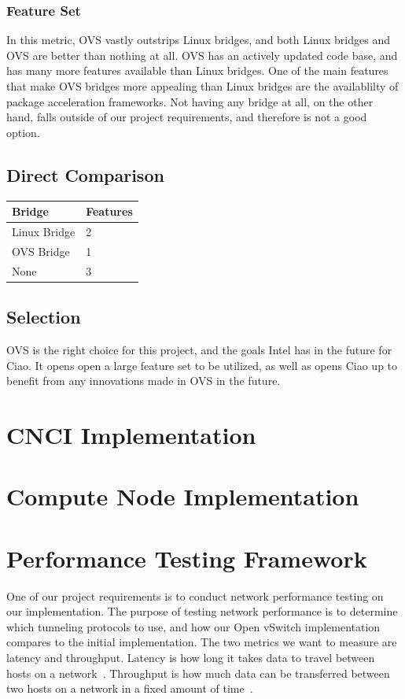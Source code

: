 \documentclass[10pt,letterpaper,onecolumn,draftclsnofoot]{IEEEtran}
\begin{document}
\subsubsection{Feature Set}
In this metric, OVS vastly outstrips Linux bridges, and both Linux bridges and
OVS are better than nothing at all. OVS has an actively updated code base, and
has many more features available than Linux bridges. \cite{ovs-linuxbridge} One
of the main features that make OVS bridges more appealing than Linux bridges are
the availablilty of package acceleration frameworks. Not having any bridge at
all, on the other hand, falls outside of our project requirements, and therefore
is not a good option.

\subsection{Direct Comparison}
\begin{center}
	\begin{tabular}{| l | l |}
		\hline
		Bridge & Features \\ \hline
		Linux Bridge & 2 \\ \hline
		OVS Bridge & 1 \\ \hline
		None & 3 \\ \hline
	\end{tabular}
\end{center}

\subsection{Selection}
OVS is the right choice for this project, and the goals Intel has in the future
for Ciao. It opens open a large feature set to be utilized, as well as opens
Ciao up to benefit from any innovations made in OVS in the future.


\section{CNCI Implementation}

\section{Compute Node Implementation}

\section{Performance Testing Framework}
One of our project requirements is to conduct network performance testing on our implementation.
The purpose of testing network performance is to determine which tunneling protocols to use, 
and how our Open vSwitch implementation compares to the initial implementation.
The two metrics we want to measure are latency and throughput.
Latency is how long it takes data to travel between hosts on a network~\cite{topdown-ssl}.
Throughput is how much data can be transferred between two hosts on a network in a fixed amount of time~\cite{topdown-ssl}.
\end{document}
